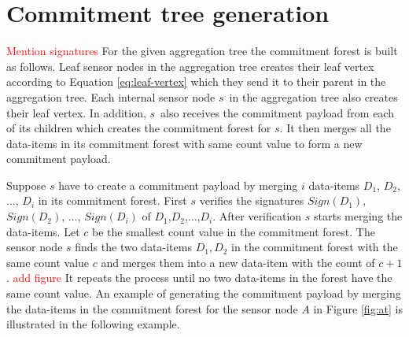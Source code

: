 	\section{Commitment tree generation}
	\textcolor{red}{Mention signatures}
	For the given aggregation tree the commitment forest is built as follows.
	Leaf sensor nodes in the aggregation tree creates their leaf vertex according to Equation \ref{eq:leaf-vertex} which they send it to their parent in the aggregation tree.
	Each internal sensor node $s$\ in the aggregation tree also creates their leaf vertex.
	In addition, $s$\ also receives the commitment payload from each of its children which creates the commitment forest for $s$.
	It then merges all the data-items in its commitment forest with same count value to form a new commitment payload.

	Suppose $s$ have to create a commitment payload by merging $i$ data-items $D_{1}$, $D_{2}$, $\dotsc$, $D_{i}$ in its commitment forest.
	First $s$ verifies the signatures $Sign(D_{1})$, $Sign(D_{2})$, $\dotsc$, $Sign(D_{i})$ of $D_{1}$,$D_{2}$,$\dotsc$,$D_{i}$.
	After verification $s$ starts merging the data-items.
	Let $c$ be the smallest count value in the commitment forest.
	The sensor node $s$ finds the two data-items $D_{1},D_{2}$ in the commitment forest with the same count value $c$ and merges them into a new data-item with the count of $c+1$.
	\textcolor{red}{add figure}
	It repeats the process until no two data-items in the forest have the same count value.
	An example of generating the commitment payload by merging the data-items in the commitment forest for the sensor node $A$ in Figure \ref{fig:at} is illustrated in the following example.
